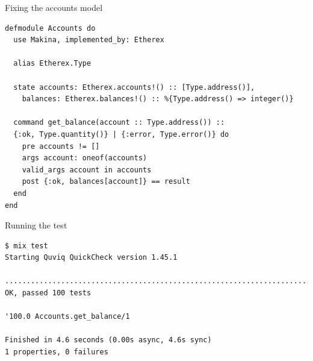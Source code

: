 \documentclass[aspectratio=169, 10pt]{beamer}
\begin{document}
\begin{frame}[label={sec:org4ccfd26},fragile]{Fixing the accounts model}
 \lstset{language=elixir,label= ,caption= ,captionpos=b,numbers=none,style=display}
\begin{lstlisting}
defmodule Accounts do
  use Makina, implemented_by: Etherex

  alias Etherex.Type

  state accounts: Etherex.accounts!() :: [Type.address()],
    balances: Etherex.balances!() :: %{Type.address() => integer()}

  command get_balance(account :: Type.address()) ::
  {:ok, Type.quantity()} | {:error, Type.error()} do
    pre accounts != []
    args account: oneof(accounts)
    valid_args account in accounts
    post {:ok, balances[account]} == result
  end
end
\end{lstlisting}
\end{frame}

\begin{frame}[label={sec:orge1c1cd6},fragile]{Running the test}
 \lstset{language=bash,label= ,caption= ,captionpos=b,numbers=none,style=shell}
\begin{lstlisting}
$ mix test
Starting Quviq QuickCheck version 1.45.1

....................................................................................................
OK, passed 100 tests

'100.0 Accounts.get_balance/1

Finished in 4.6 seconds (0.00s async, 4.6s sync)
1 properties, 0 failures
\end{lstlisting}
\end{frame}
\end{document}

